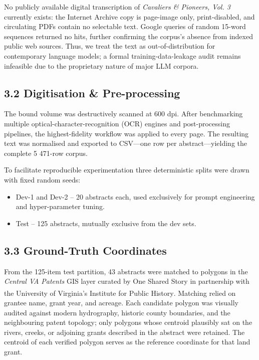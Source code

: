 \documentclass[
  10pt]{article}
\providecommand{\tightlist}{%
  \setlength{\itemsep}{0pt}\setlength{\parskip}{0pt}}
\begin{document}
No publicly available digital transcription of \emph{Cavaliers \&
Pioneers, Vol. 3} currently exists: the Internet Archive copy is
page-image only, print-disabled, and circulating PDFs contain no
selectable text. Google queries of random 15-word sequences returned no
hits, further confirming the corpus's absence from indexed public web
sources. Thus, we treat the text as out-of-distribution for contemporary
language models; a formal training-data-leakage audit remains infeasible
due to the proprietary nature of major LLM corpora.

\subsection{3.2 Digitisation \&
Pre-processing}\label{digitisation-pre-processing}

The bound volume was destructively scanned at 600 dpi. After
benchmarking multiple optical-character-recognition (OCR) engines and
post-processing pipelines, the highest-fidelity workflow was applied to
every page. The resulting text was normalised and exported to CSV---one
row per abstract---yielding the complete 5 471-row corpus.

To facilitate reproducible experimentation three deterministic splits
were drawn with fixed random seeds:

\begin{itemize}
\tightlist
\item
  Dev-1 and Dev-2 -- 20 abstracts each, used exclusively for prompt
  engineering and hyper-parameter tuning.
\item
  Test -- 125 abstracts, mutually exclusive from the dev sets.
\end{itemize}

\subsection{3.3 Ground-Truth
Coordinates}\label{ground-truth-coordinates}

From the 125-item test partition, 43 abstracts were matched to polygons
in the \emph{Central VA Patents} GIS layer curated by One Shared Story
in partnership with the University of Virginia's Institute for Public
History\textsuperscript{}.
Matching relied on grantee name, grant year, and acreage. Each candidate
polygon was visually audited against modern hydrography, historic county
boundaries, and the neighbouring patent topology; only polygons whose
centroid plausibly sat on the rivers, creeks, or adjoining grants
described in the abstract were retained. The centroid of each verified
polygon serves as the reference coordinate for that land grant.
\end{document}
